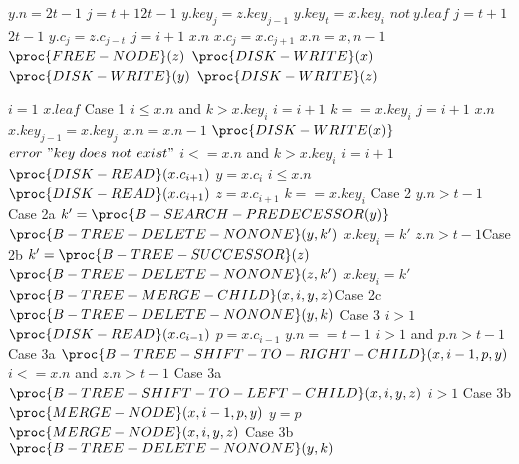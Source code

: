 \documentclass[12pt]{article}
\begin{document}
	\begin{codebox}
		\li $y.n=2t-1$
		\li \For $j=t+1$\To $2t-1$
		\li \Then $y.key_j=z.key_{j-1}$
			\End
		\li $y.key_t=x.key_i$
		\li \If $not\ y.leaf$
		\li \Then \For $j=t+1$\To$2t-1$
		\li 	  \Then $y.c_j=z.c_{j-t}$
		          \End
		    \End
		\li \For $j=i+1$ \To $x.n$
		\li \Then $x.c_j=x.c_{j+1}$
			\End 
		\li $x.n=x,n-1$
		\li $\proc{FREE-NODE}(z)$
		\li $\proc{DISK-WRITE}(x)$
		\li $\proc{DISK-WRITE}(y)$
		\li $\proc{DISK-WRITE}(z)$
	\end{codebox}
	\begin{codebox}
		\Procname{$\proc{B-TREE-DELETE-NONODE}$(x,k)}
		\li $i=1$
		\li \If $x.leaf$  \qquad\Comment Case 1
		\li \Then \While $i\leq x.n$ and $k>x.key_i$
	    \li       \Then $i=i+1$
	              \End
	    \li       \If $k==x.key_i$
	    \li       \Then \For $j=i+1$ \To $x.n$
	    \li 			\Then $x.key_{j-1}=x.key_j$
	    			    \End
	    \li             $x.n=x.n-1$
	    \li             $\proc{DISK-WRITE(x)}$
	    \li       \Else $error\ "key\ does\ not\ exist"$
	    		  \End
	    \li \Else \While $i<=x.n$ and $k>x.key_i$
	    \li				\Then  $i=i+1$
	    				\End
	    \li       $\proc{DISK-READ}(x.c_{i+1})$
	    \li 	  $y=x.c_i$
	    \li       \If $i\leqslant x.n$
	    \li       \Then $\proc{DISK-READ}(x.c_{i+1})$   
	    \li             $z=x.c_{i+1}$
	    		  \End 
	    \li       \If $k==x.key_i$ \qquad\Comment Case 2
	 	\li       \Then  \If $y.n>t-1$ \qquad\Comment Case 2a
	 	\li              \Then $k'=\proc{B-SEARCH-PREDECESSOR(y)}$
	 	\li 				   $\proc{B-TREE-DELETE-NONONE}(y,k')$
	 	\li                    $x.key_i=k'$
	 	\li              \ElseIf $z.n>t-1$\qquad\Comment Case 2b
	 	\li				 \Then $k'=\proc{B-TREE-SUCCESSOR}(z)$
	 	\li                    $\proc{B-TREE-DELETE-NONONE}(z,k')$			
	 	\li                    $x.key_i=k'$	 
	    		         \Else $\proc{B-TREE-MERGE-CHILD}(x,i,y,z)$\qquad\Comment Case 2c
		\li					   $\proc{B-TREE-DELETE-NONONE}(y,k)$    		         
	    		  \End
	    \li       \Else \qquad\Comment Case 3
	    \li             \If $i>1$
	    \li				\Then $\proc{DISK-READ}(x.c_{i-1})$
	    \li                   $p=x.c_{i-1}$
	   					\End
	    \li             \If	  $y.n==t-1$
	    \li 			\Then \If $i>1$ and $p.n>t-1$ \qquad\Comment Case 3a
	    \li                   \Then $\proc{B-TREE-SHIFT-TO-RIGHT-CHILD}(x,i-1,p,y)$
	                          \ElseIf $i<=x.n$ and $z.n>t-1$ \qquad\Comment Case 3a
        \li	                  \Then    $\proc{B-TREE-SHIFT-TO-LEFT-CHILD}(x,i,y,z)$
        \li                   \ElseIf $i>1$ \qquad\Comment Case 3b
        \li                   \Then   $\proc{MERGE-NODE}(x,i-1,p,y)$
        \li                           $y=p$
        \li                   \Else $\proc{MERGE-NODE}(x,i,y,z)$ \qquad\Comment Case 3b
        					  \End	
        					  \End
        \li		        $\proc{B-TREE-DELETE-NONONE}(y,k)$
	\end{codebox}
\end{document}
